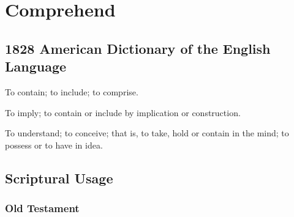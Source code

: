 \section{Comprehend}
	\label{COMPREHEND}
	

\subsection{1828 American Dictionary of the English Language} %
	\label{COMPREHEND-1828}

	\begin{compactitem}
		\item[1] To contain; to include; to comprise.
		\item[2] To imply; to contain or include by implication or construction.
		\item[3] To understand; to conceive; that is, to take, hold or contain in the mind; to possess or to have in idea.
	\end{compactitem}



\subsection{Scriptural Usage} %
	\label{COMPREHEND-SCRIPTURES}

	\subsubsection{Old Testament} %
		\label{COMPREHEND-OT}
	
